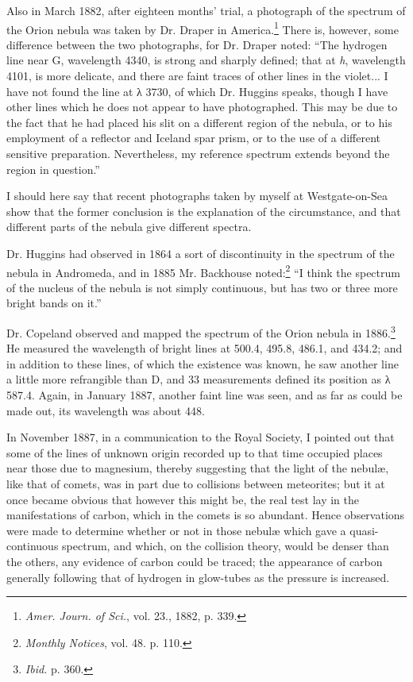 \documentclass[a4paper, 12pt, oneside, polutonikogreek, english]{article}
\begin{document}
Also in March 1882, after eighteen months' trial, a photograph of the spectrum of the Orion nebula was taken by Dr. Draper in America.\footnote{\emph{Amer. Journ. of Sci.}, vol. 23., 1882, p. 339.} There is, however, some difference between the two photographs, for Dr. Draper noted: ``The hydrogen line near G, wavelength 4340, is strong and sharply defined; that at \emph{h}, wavelength 4101, is more delicate, and there are faint traces of other lines in the violet... I have not found the line at λ 3730, of which Dr. Huggins speaks, though I have other lines which he does not appear to have photographed. This may be due to the fact that he had placed his slit on a different region of the nebula, or to his employment of a reflector and Iceland spar prism, or to the use of a different sensitive preparation. Nevertheless, my reference spectrum extends beyond the region in question.''

I should here say that recent photographs taken by myself at Westgate-on-Sea show that the former conclusion is the explanation of the circumstance, and that different parts of the nebula give different spectra.

Dr. Huggins had observed in 1864 a sort of discontinuity in the spectrum of the nebula in Andromeda, and in 1885 Mr. Backhouse noted:\footnote{\emph{Monthly Notices}, vol. 48. p. 110.} ``I think the spectrum of the nucleus of the nebula is not simply continuous, but has two or three more bright bands on it.''

Dr. Copeland observed and mapped the spectrum of the Orion nebula in 1886.\footnote{\emph{Ibid.} p. 360.} He measured the wavelength of bright lines at 500.4, 495.8, 486.1, and 434.2; and in addition to these lines, of which the existence was known, he saw another line a little more refrangible than D, and 33 measurements defined its position as λ 587.4. Again, in January 1887, another faint line was seen, and as far as could be made out, its wavelength was about 448.

In November 1887, in a communication to the Royal Society, I pointed out that some of the lines of unknown origin recorded up to that time occupied places near those due to magnesium, thereby suggesting that the light of the nebulæ, like that of comets, was in part due to collisions between meteorites; but it at once became obvious that however this might be, the real test lay in the manifestations of carbon, which in the comets is so abundant. Hence observations were made to determine whether or not in those nebulæ which gave a quasi-continuous spectrum, and which, on the collision theory, would be denser than the others, any evidence of carbon could be traced; the appearance of carbon generally following that of hydrogen in glow-tubes as the pressure is increased.
\end{document}

